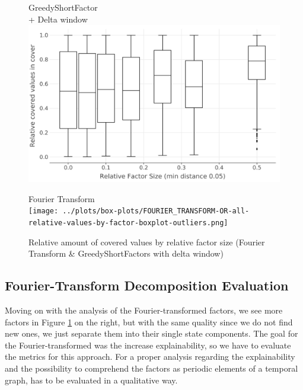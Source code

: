 \begin{figure}[b]
	\begin{minipage}[h]{0.49\linewidth}
		\centering
		GreedyShortFactor\\
		+ Delta window
		\includegraphics[width=\linewidth]{../delta-plots/box-plots/GREEDY_SHORT_FACTORS-OR-all-relative-values-by-factor-boxplot-dist.png}
	\end{minipage}
	\begin{minipage}[h]{0.49\linewidth}
		\centering
		Fourier Transform\\
		\hfill \break
		\texttt{[image: ../plots/box-plots/FOURIER\_TRANSFORM-OR-all-relative-values-by-factor-boxplot-outliers.png]}
	\end{minipage}
	\caption{Relative amount of covered values by relative factor size (Fourier Transform \& GreedyShortFactors with delta window)}
	\label{fig:eval:greedy-short-factors-all-factors-box-plot-delta}
\end{figure}

\subsection{Fourier-Transform Decomposition Evaluation}
\label{ch:Evaluation:decomposition-quality:fourier}
Moving on with the analysis of the Fourier-transformed factors, we see more factors in Figure \ref{fig:eval:greedy-short-factors-all-factors-box-plot-delta} on the right, but with the same quality since we do not find new ones, we just separate them into their  single state components.
The goal for the Fourier-transformed \orDecomp was the increase explainability, so we have to evaluate the metrics for this approach.
For a proper analysis regarding the explainability and the possibility to comprehend the factors as periodic elements of a temporal graph, has to be evaluated in a qualitative way.

